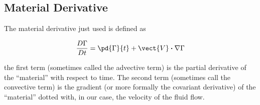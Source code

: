 \subsection{Material Derivative}

The material derivative just used is defined as

\begin{equation}
	\frac{D\Gamma}{Dt} = \pd{\Gamma}{t} + \vect{V} \boldsymbol{\cdot} \nabla \Gamma
\end{equation}

\where the first term (sometimes called the advective term) is the partial derivative of the ``material'' with respect to time.
The second term (sometimes call the convective term) is the gradient (or more formally the covariant derivative) of the ``material'' dotted with, in our case, the velocity of the fluid flow.







